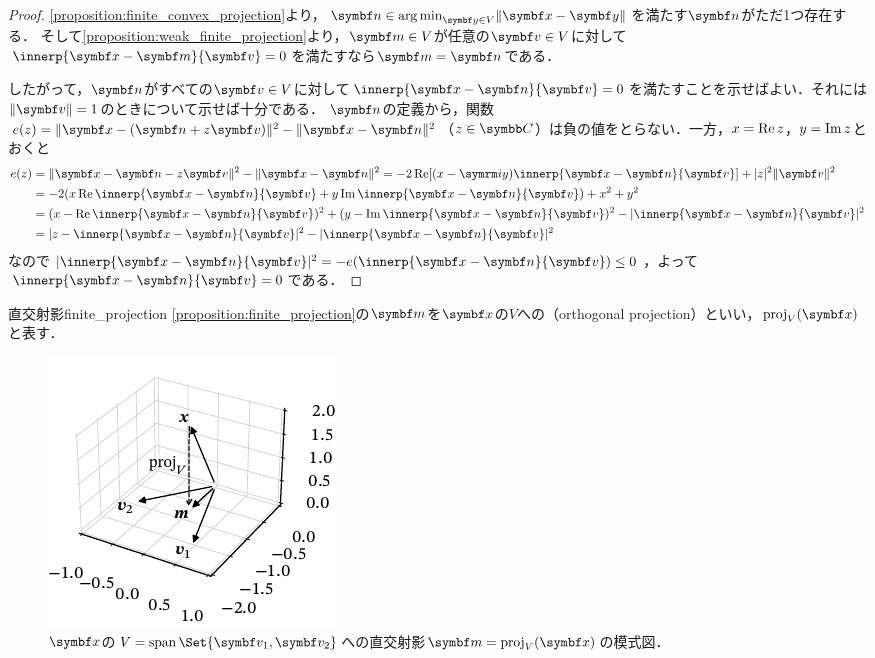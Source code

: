 \documentclass[../../main]{subfiles}
\begin{document}
\begin{proof}
  \cref{proposition:finite_convex_projection}より，\(\vect{n}\in\argmin_{\vect{y}\in V}\vnorm{\vect{x}-\vect{y}}\)を満たす\(\vect{n}\)がただ1つ存在する．
  そして\cref{proposition:weak_finite_projection}より，\(\vect{m}\in V\)が任意の\(\vect{v}\in V\)に対して\(\innerp{\vect{x}-\vect{m}}{\vect{v}}=0\)を満たすなら\(\vect{m}=\vect{n}\)である．

  したがって，\(\vect{n}\)がすべての\(\vect{v}\in V\)に対して\(\innerp{\vect{x}-\vect{n}}{\vect{v}}=0\)を満たすことを示せばよい．それには\(\vnorm{\vect{v}}=1\)のときについて示せば十分である．
  \(\vect{n}\)の定義から，関数\(e(z)=\vnorm{\vect{x}-(\vect{n}+z\vect{v})}^2-\vnorm{\vect{x}-\vect{n}}^2\)（\(z\in\numset{C}\)）は負の値をとらない．一方，\(x=\operatorname{Re} z\)，\(y=\operatorname{Im} z\)とおくと
  \begin{align*}
    e(z) &= \vnorm{\vect{x}-\vect{n}-z\vect{v}}^2-\vnorm{\vect{x}-\vect{n}}^2
    = -2\rpart[(x-\iuni y)\innerp{\vect{x}-\vect{n}}{\vect{v}}]+\abs{z}^2\vnorm{\vect{v}}^2 \\
    &= -2(x\rpart\innerp{\vect{x}-\vect{n}}{\vect{v}}+y\ipart\innerp{\vect{x}-\vect{n}}{\vect{v}})+x^2+y^2 \\
    &= (x-\rpart\innerp{\vect{x}-\vect{n}}{\vect{v}})^2+(y-\ipart\innerp{\vect{x}-\vect{n}}{\vect{v}})^2-\abs{\innerp{\vect{x}-\vect{n}}{\vect{v}}}^2 \\
    &= \abs{z-\innerp{\vect{x}-\vect{n}}{\vect{v}}}^2-\abs{\innerp{\vect{x}-\vect{n}}{\vect{v}}}^2
  \end{align*}
  なので\(\abs{\innerp{\vect{x}-\vect{n}}{\vect{v}}}^2=-e(\innerp{\vect{x}-\vect{n}}{\vect{v}})\leq 0\)，よって\(\innerp{\vect{x}-\vect{n}}{\vect{v}}=0\)である．
\end{proof}

\begin{definition}{直交射影}{finite_projection}
  \cref{proposition:finite_projection}の\(\vect{m}\)を\(\vect{x}\)の\(V\)への（orthogonal projection）といい，\(\proj_V(\vect{x})\)と表す．
\end{definition}

\begin{figure}[htbp]
  \centering
  \includegraphics{proj3d.pdf}
  \caption{\(\vect{x}\)の\(V=\spannedby\Set{\vect{v}_1,\vect{v}_2}\)への直交射影\(\vect{m}=\proj_V(\vect{x})\)の模式図．}
\end{figure}
\end{document}

